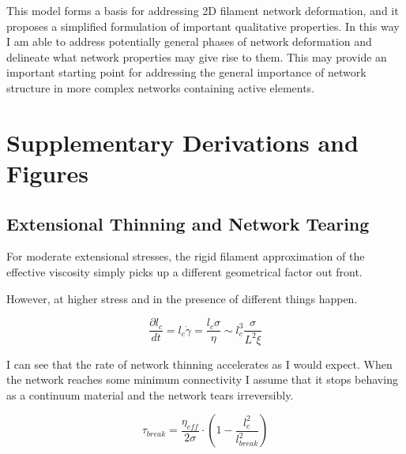 This model forms a basis for addressing 2D filament network deformation, and it proposes a simplified formulation of important qualitative properties. In this way I am able to address potentially general phases of network deformation and delineate what network properties may give rise to them.  This may provide an important starting point for addressing the general importance of network structure in more complex networks containing active elements. 






































\section{Supplementary Derivations and Figures}


\subsection{Extensional Thinning and Network Tearing}

For moderate extensional stresses, the rigid filament approximation of the effective viscosity simply picks up a different geometrical factor out front.  

However, at higher stress and in the presence of different things happen.

\begin{equation}
\frac{\partial l_c}{dt}=l_c\dot \gamma =\frac{l_c \sigma}{\eta}\sim l_c^3\frac{ \sigma}{L^2 \xi}
\end{equation}

I can see that the rate of network thinning accelerates as I would expect.  When the network reaches some minimum connectivity I assume that it stops behaving as a continuum material and the network tears irreversibly.  

\begin{equation}
\tau_{break} = \frac{\eta_{eff}}{2\sigma}\cdot\left ( 1 -\frac{l_c^2}{l_{break}^2} \right )
\end{equation}

